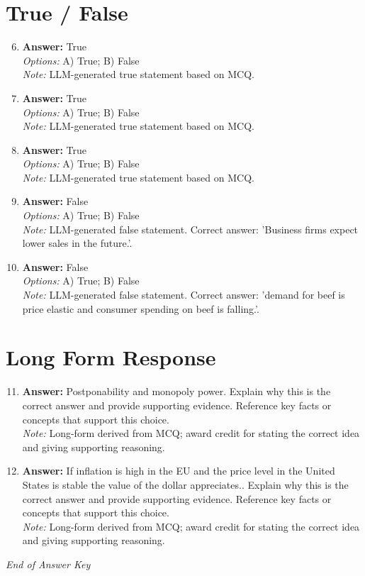\documentclass[12pt]{article}
\begin{document}
\section*{True / False}
\begin{enumerate}[label=\arabic*.]
\setcounter{enumi}{5}
\item \textbf{Answer:} True
\\ \textit{Options:} A) True; B) False
\\ \textit{Note:} LLM-generated true statement based on MCQ.
\item \textbf{Answer:} True
\\ \textit{Options:} A) True; B) False
\\ \textit{Note:} LLM-generated true statement based on MCQ.
\item \textbf{Answer:} True
\\ \textit{Options:} A) True; B) False
\\ \textit{Note:} LLM-generated true statement based on MCQ.
\item \textbf{Answer:} False
\\ \textit{Options:} A) True; B) False
\\ \textit{Note:} LLM-generated false statement. Correct answer: 'Business firms expect lower sales in the future.'.
\item \textbf{Answer:} False
\\ \textit{Options:} A) True; B) False
\\ \textit{Note:} LLM-generated false statement. Correct answer: 'demand for beef is price elastic and consumer spending on beef is falling.'.
\end{enumerate}

\section*{Long Form Response}
\begin{enumerate}[label=\arabic*.]
\setcounter{enumi}{10}
\item \textbf{Answer:} Postponability and monopoly power. Explain why this is the correct answer and provide supporting evidence. Reference key facts or concepts that support this choice.
\\ \textit{Note:} Long-form derived from MCQ; award credit for stating the correct idea and giving supporting reasoning.
\item \textbf{Answer:} If inflation is high in the EU and the price level in the United States is stable the value of the dollar appreciates.. Explain why this is the correct answer and provide supporting evidence. Reference key facts or concepts that support this choice.
\\ \textit{Note:} Long-form derived from MCQ; award credit for stating the correct idea and giving supporting reasoning.
\end{enumerate}

\vfill
\noindent\textit{End of Answer Key}
\end{document}
